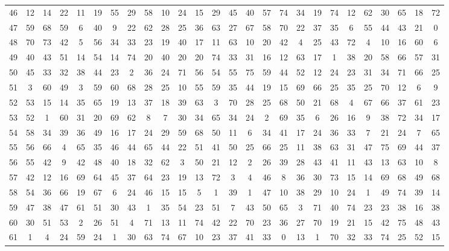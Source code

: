 \begin{table}
\begin{tabular}{c c c c c c c c c c c c c c c c c c c c c c c c c c }
46 & 12 & 14 & 22 & 11 & 19 & 55 & 29 & 58 & 10 & 24 & 15 & 29 & 45 & 40 & 57 & 74 & 34 & 19 & 74 & 12 & 62 & 30 & 65 & 18 & 72 \\
47 & 59 & 68 & 59 & 6 & 40 & 9 & 22 & 62 & 28 & 25 & 36 & 63 & 27 & 67 & 58 & 70 & 22 & 37 & 35 & 6 & 55 & 44 & 43 & 21 & 0 \\
48 & 70 & 73 & 42 & 5 & 56 & 34 & 33 & 23 & 19 & 40 & 17 & 11 & 63 & 10 & 20 & 42 & 4 & 25 & 43 & 72 & 4 & 10 & 16 & 60 & 6 \\
49 & 40 & 43 & 51 & 14 & 54 & 14 & 74 & 20 & 40 & 20 & 20 & 74 & 33 & 31 & 16 & 12 & 63 & 17 & 1 & 38 & 20 & 58 & 66 & 57 & 31 \\
50 & 45 & 33 & 32 & 38 & 44 & 23 & 2 & 36 & 24 & 71 & 56 & 54 & 55 & 75 & 59 & 44 & 52 & 12 & 24 & 23 & 31 & 34 & 71 & 66 & 25 \\
51 & 3 & 60 & 49 & 3 & 59 & 60 & 68 & 28 & 25 & 10 & 55 & 59 & 35 & 44 & 19 & 15 & 69 & 66 & 25 & 35 & 25 & 70 & 12 & 6 & 9 \\
52 & 53 & 15 & 14 & 35 & 65 & 19 & 13 & 37 & 18 & 39 & 63 & 3 & 70 & 28 & 25 & 68 & 50 & 21 & 68 & 4 & 67 & 66 & 37 & 61 & 23 \\
53 & 52 & 1 & 60 & 31 & 20 & 69 & 62 & 8 & 7 & 30 & 34 & 65 & 34 & 24 & 2 & 69 & 35 & 6 & 26 & 16 & 9 & 38 & 72 & 34 & 17 \\
54 & 58 & 34 & 39 & 36 & 49 & 16 & 17 & 24 & 29 & 59 & 68 & 50 & 11 & 6 & 34 & 41 & 17 & 24 & 36 & 33 & 7 & 21 & 24 & 7 & 65 \\
55 & 56 & 66 & 4 & 65 & 35 & 46 & 44 & 65 & 44 & 22 & 51 & 41 & 50 & 25 & 66 & 25 & 11 & 38 & 63 & 31 & 47 & 75 & 69 & 44 & 37 \\
56 & 55 & 42 & 9 & 42 & 48 & 40 & 18 & 32 & 62 & 3 & 50 & 21 & 12 & 2 & 26 & 39 & 28 & 43 & 41 & 11 & 43 & 13 & 63 & 10 & 8 \\
57 & 42 & 12 & 16 & 69 & 64 & 45 & 37 & 64 & 23 & 19 & 13 & 72 & 3 & 4 & 46 & 8 & 36 & 30 & 73 & 15 & 14 & 69 & 68 & 49 & 68 \\
58 & 54 & 36 & 66 & 19 & 67 & 6 & 24 & 46 & 15 & 15 & 5 & 1 & 39 & 1 & 47 & 10 & 38 & 29 & 10 & 24 & 1 & 49 & 74 & 39 & 14 \\
59 & 47 & 38 & 47 & 61 & 51 & 30 & 43 & 1 & 35 & 54 & 23 & 51 & 7 & 43 & 50 & 65 & 3 & 71 & 40 & 74 & 23 & 23 & 38 & 16 & 38 \\
60 & 30 & 51 & 53 & 2 & 26 & 51 & 4 & 71 & 13 & 11 & 74 & 42 & 22 & 70 & 23 & 36 & 27 & 70 & 19 & 21 & 15 & 42 & 75 & 48 & 43 \\
61 & 1 & 4 & 24 & 59 & 24 & 1 & 30 & 63 & 74 & 67 & 10 & 23 & 37 & 41 & 33 & 0 & 13 & 1 & 70 & 32 & 33 & 74 & 25 & 52 & 15 \\

\end{tabular}
\end{table}
